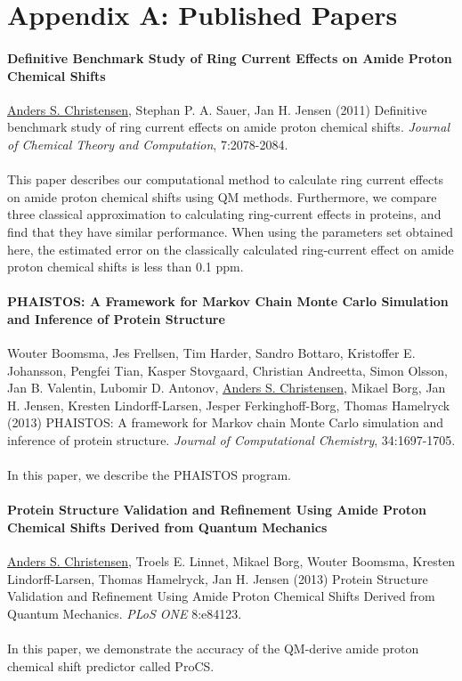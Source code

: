 \chapter{Appendix A: Published Papers}

\subsubsection{Definitive Benchmark Study of Ring Current Effects on Amide Proton Chemical Shifts}
\underline{Anders S. Christensen}, Stephan P. A. Sauer, Jan H. Jensen (2011) Definitive benchmark study of ring current effects on amide proton chemical shifts. \textit{Journal of Chemical Theory and Computation}, 7:2078-2084.
\\\\ This paper describes our computational method to calculate ring current effects on amide proton chemical shifts using QM methods.
Furthermore, we compare three classical approximation to calculating ring-current effects in proteins, and find that they have similar performance.
When using the parameters set obtained here, the estimated error on the classically calculated ring-current effect on amide proton chemical shifts is less than 0.1 ppm.
\clearpage


\subsubsection{PHAISTOS: A Framework for Markov Chain Monte Carlo Simulation and Inference of Protein Structure}
Wouter Boomsma, Jes Frellsen, Tim Harder, Sandro Bottaro, Kristoffer E. Johansson, Pengfei Tian, Kasper Stovgaard, Christian Andreetta, Simon Olsson, Jan B. Valentin, Lubomir D. Antonov, \underline{Anders S. Christensen}, Mikael Borg, Jan H. Jensen, Kresten Lindorff-Larsen, Jesper Ferkinghoff-Borg, Thomas Hamelryck (2013) PHAISTOS: A framework for Markov chain Monte Carlo simulation and inference of protein structure. \textit{Journal of Computational Chemistry}, 34:1697-1705.
\\\\ In this paper, we describe the PHAISTOS program.
\clearpage


\subsubsection{Protein Structure Validation and Refinement Using Amide Proton Chemical Shifts Derived from Quantum Mechanics}
\underline{Anders S. Christensen}, Troels E. Linnet, Mikael Borg, Wouter Boomsma, Kresten Lindorff-Larsen, Thomas Hamelryck, Jan H. Jensen (2013)  Protein Structure Validation and Refinement Using Amide Proton Chemical Shifts Derived from Quantum Mechanics. \textit{PLoS ONE} 8:e84123.
\\\\ In this paper, we demonstrate the accuracy of the QM-derive amide proton chemical shift predictor called ProCS.
\clearpage



